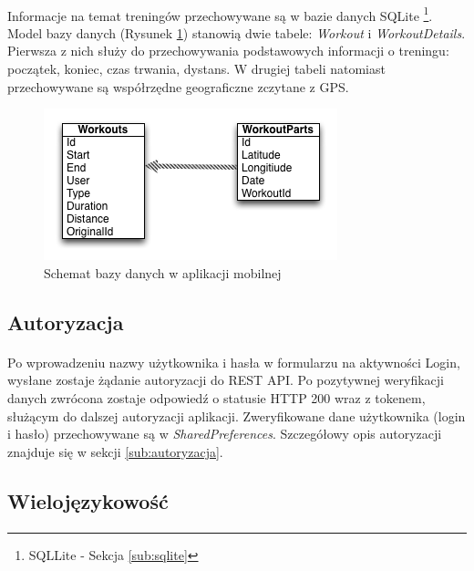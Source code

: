 \paragraph{} %
\label{par:}

Informacje na temat treningów przechowywane są w bazie danych SQLite \footnote{SQLLite - Sekcja \ref{sub:sqlite}}. Model bazy danych (Rysunek \ref{fig:sqlite-model}) stanowią dwie tabele: \textit{Workout} i \textit{WorkoutDetails}. Pierwsza z nich służy do przechowywania podstawowych informacji o treningu: początek, koniec, czas trwania, dystans. W drugiej tabeli natomiast przechowywane są współrzędne geograficzne zczytane z GPS.
\begin{figure}[ht]
	\centering
		\includegraphics[width=0.6\linewidth]{assets/sql_schema.png}
		\caption{Schemat bazy danych w aplikacji mobilnej}
	\label{fig:sqlite-model}
\end{figure}

\subsection{Autoryzacja} %
\label{sub:}
\paragraph{} %
\label{par:}
Po wprowadzeniu nazwy użytkownika i hasła w formularzu na aktywności Login, wysłane zostaje żądanie autoryzacji do REST API. Po pozytywnej weryfikacji danych zwrócona zostaje odpowiedź o statusie HTTP 200 wraz z tokenem, służącym do dalszej autoryzacji aplikacji. Zweryfikowane dane użytkownika (login i hasło) przechowywane są w \textit{SharedPreferences}. Szczegółowy opis autoryzacji znajduje się w sekcji \ref{sub:autoryzacja}.

\subsection{Wielojęzykowość} %
\label{sub:wieloj_zykow_}
\paragraph{} %
\label{par:}

